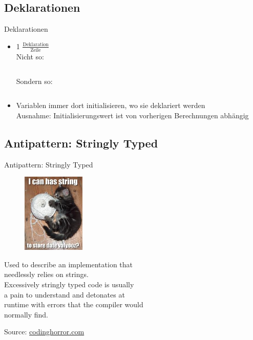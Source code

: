 \documentclass[usepdftitle=false,hyperref={pdfpagelabels=false}]{beamer}
\begin{document}
\subsection{Deklarationen}
\begin{frame}{Deklarationen}
    \begin{itemize}
        \item 1 $\frac{\text{Deklaration}}{\text{Zeile}}$\\
              \vspace{4mm}
              Nicht so:
              \inputminted[linenos=true, numbersep=5pt, tabsize=4, fontsize=\small, firstline=19, lastline=19]{java}{JavaDoc.java}
              \vspace{4mm}
              Sondern so:
              \inputminted[linenos=true, numbersep=5pt, tabsize=4, fontsize=\small, firstline=21, lastline=22]{java}{JavaDoc.java}
        \item Variablen immer dort initialisieren, wo sie deklariert werden\\
              Ausnahme: Initialisierungswert ist von vorherigen Berechnungen abhängig
    \end{itemize}
\end{frame}

\subsection{Antipattern: Stringly Typed}
\begin{frame}{Antipattern: Stringly Typed}
\begin{figure}
    \includegraphics[width=3cm]{stringly-typed.jpg}
\end{figure}

Used to describe an implementation that \\
needlessly relies on strings.\\
\vspace{2cm}
Excessively stringly typed code is usually\\
a pain to understand and detonates at \\
runtime with errors that the compiler would \\
normally find.

Source: \href{http://www.codinghorror.com/blog/2012/07/new-programming-jargon.html}{codinghorror.com}
\end{frame}
\end{document}
